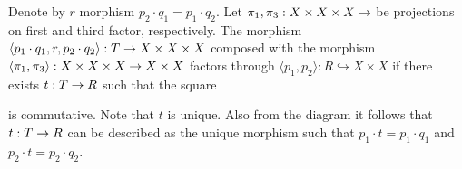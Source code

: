 Denote by $r$ morphism $p_2\cdot q_1 = p_1\cdot q_2$. Let $\pi_1,\pi_3:X\times X\times X\rightarrow $ be projections on first and third factor, respectively. The morphism $\langle p_1\cdot q_1, r, p_2\cdot q_2\rangle:T\rightarrow X\times X \times X$ composed with the morphism $\langle \pi_1,\pi_3\rangle:X\times X\times X\rightarrow X\times X$ factors through $\langle p_1,p_2\rangle:R\hookrightarrow X\times X$ if there exists $t:T\rightarrow R$ such that the square
\begin{center}
\end{center}
is commutative. Note that $t$ is unique. Also from the diagram it follows that $t:T\rightarrow R$ can be described as the unique morphism such that $p_1\cdot t =  p_1\cdot q_1$ and $p_2\cdot t = p_2\cdot q_2$.

